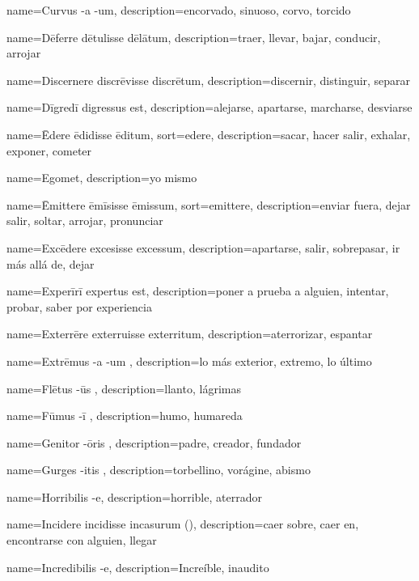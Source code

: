 {name={Curvus -a -um},
description={encorvado, sinuoso, corvo, torcido}}

{name={Dēferre dētulisse dēlātum},
description={traer, llevar, bajar, conducir, arrojar}}

{name={Discernere discrēvisse discrētum},
description={discernir, distinguir, separar}}

{name={Dīgredī digressus est},
description={alejarse, apartarse, marcharse, desviarse}}

{name={Ēdere ēdidisse ēditum},
sort={edere},
description={sacar, hacer salir, exhalar, exponer, cometer}}


{name={Egomet},
description={yo mismo}}

{name={Ēmittere ēmīsisse ēmissum},
sort={emittere},
description={enviar fuera, dejar salir, soltar, arrojar, pronunciar}}

{name={Excēdere excesisse excessum},
description={apartarse, salir, sobrepasar, ir más allá de, dejar}}

{name={Experīrī expertus est},
description={poner a prueba a alguien, intentar, probar, saber por experiencia}}

{name={Exterrēre exterruisse exterritum},
description={aterrorizar, espantar}}

{name={Extrēmus -a -um },
description={lo más exterior, extremo, lo último}}

{name={Flētus -ūs },
description={llanto, lágrimas}}

{name={Fūmus -ī },
description={humo, humareda}}

{name={Genitor -ōris },
description={padre, creador, fundador}}

{name={Gurges -itis },
description={torbellino, vorágine, abismo}}

{name={Horribilis -e},
description={horrible, aterrador}}

{name={Incidere incidisse incasurum ()},
description={caer sobre, caer en, encontrarse con alguien, llegar }}

{name={Incredibilis -e},
description={Increíble, inaudito}}

